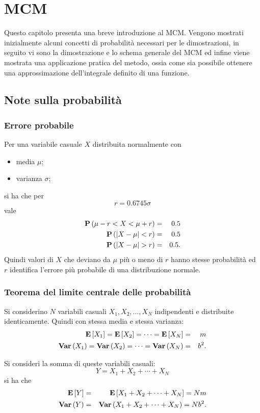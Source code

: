\chapter{\acf{MCM}}
  Questo capitolo presenta una breve introduzione al \acf{MCM}. Vengono
  mostrati inizialmente alcuni concetti di probabilit\`a necessari per
  le dimostrazioni, in seguito vi sono la dimostrazione e lo schema
  generale del \ac{MCM} ed infine viene mostrata una applicazione
  pratica del metodo, ossia come sia possibile ottenere una
  approssimazione dell'integrale definito di una funzione.
\section{Note sulla probabilit\`a}
\subsection{Errore probabile}
Per una variabile casuale $X$ distribuita normalmente con
\begin{itemize}
\item media $\mu$;
\item varianza $\sigma$;
\end{itemize}
si ha che per
\begin{equation*}
  r = 0.6745\sigma
\end{equation*}
vale
\begin{eqnarray*}
  \prob{\mu-r<X<\mu+r} &=& 0.5\\
  \prob{\abs{X-\mu}<r} &=& 0.5\\
  \prob{\abs{X-\mu}>r} &=& 0.5.
\end{eqnarray*}
Quindi valori di $X$ che deviano da $\mu$ pi\`u o meno di $r$ hanno
stesse probabilit\`a ed $r$ identifica l'errore pi\`u probabile di
una distribuzione normale.

\subsection{Teorema del limite centrale delle probabilit\`a}
Si considerino $N$ variabili casuali $X_1,X_2,\dots,X_N$ indipendenti e distribuite
identicamente. Quindi con stessa media e stessa varianza:
\begin{eqnarray*}
  \mathrm{\textbf{E}}\left[X_1\right]=\mathrm{\textbf{E}}\left[X_2\right]=\dots=\mathrm{\textbf{E}}\left[X_N\right]&=&m\\
  \mathrm{\textbf{Var}}\left(X_1\right)=\mathrm{\textbf{Var}}\left(X_2\right)=\dots=\mathrm{\textbf{Var}}\left(X_N\right)&=&b^2.
\end{eqnarray*}

Si consideri la somma di queste variabili casuali:
\begin{equation*}
  Y = X_1+X_2+\cdots+X_N
\end{equation*}
si ha che
\begin{eqnarray*}
  \mathrm{\textbf{E}}\left[Y\right]&=&\mathrm{\textbf{E}}\left[X_1+X_2+\cdots+X_N\right]=Nm\\
  \mathrm{\textbf{Var}}\left(Y\right)&=&\mathrm{\textbf{Var}}\left(X_1+X_2+\cdots+X_N\right)=Nb^2.
\end{eqnarray*}

